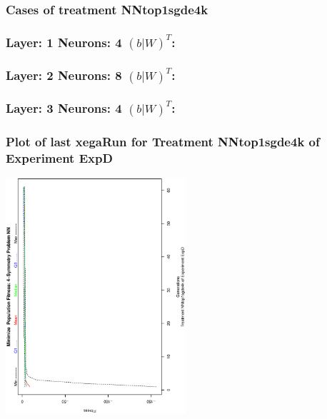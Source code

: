 \documentclass[18pt,c]{beamer}
\begin{document}
 \begin{frame}
 \fontsize{8pt}{9pt}\selectfont
 \frametitle{ Cases of treatment NNtop1sgde4k }

 \label{ExpDSolutionTable023.tex}  
 \end{frame}


 \begin{frame}
 \fontsize{8pt}{9pt}\selectfont
 \frametitle{ Layer: 1 Neurons: 4  $(b|W)^T$: 
 }

 \label{ExpDNNWeightTable021.tex}  
 \end{frame}


 \begin{frame}
 \fontsize{8pt}{9pt}\selectfont
 \frametitle{ Layer: 2 Neurons: 8  $(b|W)^T$: 
 }

 \label{ExpDNNWeightTable022.tex}  
 \end{frame}


 \begin{frame}
 \fontsize{8pt}{9pt}\selectfont
 \frametitle{ Layer: 3 Neurons: 4  $(b|W)^T$: 
 }

 \label{ExpDNNWeightTable023.tex}  
 \end{frame}

 \begin{frame}
 \frametitle{ Plot of last xegaRun for Treatment NNtop1sgde4k of Experiment ExpD }
 \begin{center}
\includegraphics[width=0.5\textwidth, angle=-90]
{ExpDPlotPopStatsFigure007.eps}
 \end{center}
 \label{report/ExpDPlotPopStatsFigure007.eps}  
 \end{frame}
\end{document}
